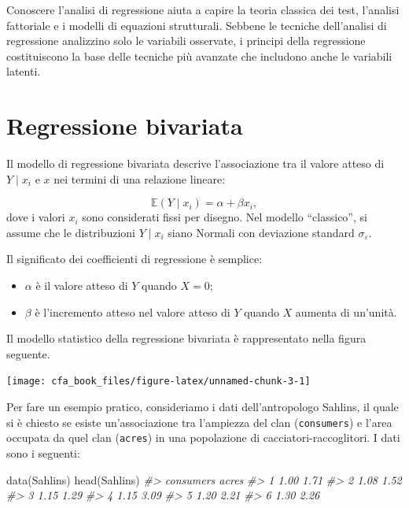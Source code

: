 \documentclass[
  11pt,
]{krantz}
\makeatletter
\newenvironment{Shaded}{\begin{snugshade}}{\end{snugshade}}
\newcommand{\CommentTok}[1]{\textcolor[rgb]{0.37,0.37,0.37}{\textit{#1}}}
\newcommand{\FunctionTok}[1]{\textcolor[rgb]{0,0,0}{#1}}
\newcommand{\NormalTok}[1]{#1}
\providecommand{\tightlist}{%
  \setlength{\itemsep}{0pt}\setlength{\parskip}{0pt}}
\newenvironment{kframe}{%
\medskip{}
\setlength{\fboxsep}{.8em}
 \def\at@end@of@kframe{}%
 \ifinner\ifhmode%
  \def\at@end@of@kframe{\end{minipage}}%
  \begin{minipage}{\columnwidth}%
 \fi\fi%
 \def\FrameCommand##1{\hskip\@totalleftmargin \hskip-\fboxsep
 \colorbox{shadecolor}{##1}\hskip-\fboxsep
     \hskip-\linewidth \hskip-\@totalleftmargin \hskip\columnwidth}%
 \MakeFramed {\advance\hsize-\width
   \@totalleftmargin\z@ \linewidth\hsize
   \@setminipage}}%
 {\par\unskip\endMakeFramed%
 \at@end@of@kframe}
\renewenvironment{Shaded}{\begin{kframe}}{\end{kframe}}
\theoremstyle{definition}
\theoremstyle{definition}
\theoremstyle{definition}
\theoremstyle{definition}
\theoremstyle{remark}
\makeatother
\begin{document}
Conoscere l'analisi di regressione aiuta a capire la teoria classica dei test, l'analisi fattoriale e i modelli di equazioni strutturali. Sebbene le tecniche dell'analisi di regressione analizzino solo le variabili osservate, i principi della regressione costituiscono la base delle tecniche più avanzate che includono anche le variabili latenti.

\hypertarget{regressione-bivariata}{%
\section{Regressione bivariata}\label{regressione-bivariata}}

Il modello di regressione bivariata descrive l'associazione tra il valore atteso di \(Y \mid x_i\) e \(x\) nei termini di una relazione lineare:

\[
\mathbb{E}(Y \mid x_i) = \alpha + \beta x_i,
\] dove i valori \(x_i\) sono considerati fissi per disegno. Nel modello ``classico'', si assume che le distribuzioni \(Y \mid x_i\) siano Normali con deviazione standard \(\sigma_\varepsilon\).

Il significato dei coefficienti di regressione è semplice:

\begin{itemize}
\tightlist
\item
  \(\alpha\) è il valore atteso di \(Y\) quando \(X = 0\);
\item
  \(\beta\) è l'incremento atteso nel valore atteso di \(Y\) quando \(X\) aumenta di un'unità.
\end{itemize}

Il modello statistico della regressione bivariata è rappresentato nella figura seguente.

\begin{center}\texttt{[image: cfa\_book\_files/figure-latex/unnamed-chunk-3-1]} \end{center}

Per fare un esempio pratico, consideriamo i dati dell'antropologo Sahlins, il quale si è chiesto se esiste un'associazione tra l'ampiezza del clan (\texttt{consumers}) e l'area occupata da quel clan (\texttt{acres}) in una popolazione di cacciatori-raccoglitori. I dati sono i seguenti:

\begin{Shaded}
\begin{Highlighting}[]
\FunctionTok{data}\NormalTok{(Sahlins)}
\FunctionTok{head}\NormalTok{(Sahlins)}
\CommentTok{\#\textgreater{}   consumers acres}
\CommentTok{\#\textgreater{} 1      1.00  1.71}
\CommentTok{\#\textgreater{} 2      1.08  1.52}
\CommentTok{\#\textgreater{} 3      1.15  1.29}
\CommentTok{\#\textgreater{} 4      1.15  3.09}
\CommentTok{\#\textgreater{} 5      1.20  2.21}
\CommentTok{\#\textgreater{} 6      1.30  2.26}
\end{Highlighting}
\end{Shaded}
\end{document}
